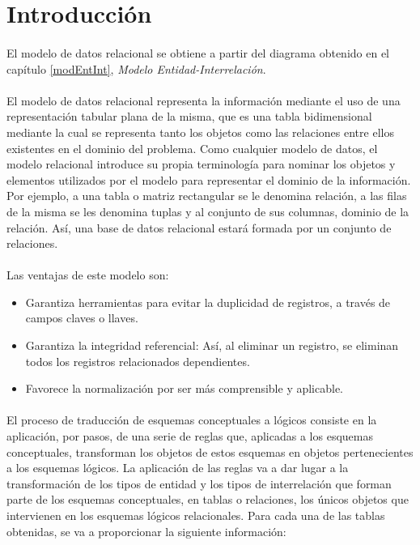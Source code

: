 \section{Introducción}

   \paragraph{}El modelo de datos relacional se obtiene a partir del diagrama
   obtenido en el capítulo \ref{modEntInt}, \textit{Modelo
   Entidad-Interrelación}.

   \paragraph{}El modelo de datos relacional representa la información mediante
   el uso de una representación tabular plana de la misma, que es una tabla
   bidimensional mediante la cual se representa tanto los objetos como las
   relaciones entre ellos existentes en el dominio del problema. Como cualquier
   modelo de datos, el modelo relacional introduce su propia terminología para
   nominar los objetos y elementos utilizados por el modelo para representar el
   dominio de la información. Por ejemplo, a una tabla o matriz rectangular se
   le denomina relación, a las filas de la misma se les denomina tuplas y al
   conjunto de sus columnas, dominio de la relación. Así, una base de datos
   relacional estará formada por un conjunto de relaciones.

   \paragraph{}Las ventajas de este modelo son:

   \begin{itemize}
    \item Garantiza herramientas para evitar la duplicidad de registros, a
    través de campos claves o llaves.
    \item Garantiza la integridad referencial: Así, al eliminar un registro,
    se eliminan todos los registros relacionados dependientes.
    \item Favorece la normalización por ser más comprensible y aplicable.
   \end{itemize}

   \paragraph{}El proceso de traducción de esquemas conceptuales a lógicos
   consiste en la aplicación, por pasos, de una serie de reglas que, aplicadas a
   los esquemas conceptuales, transforman los objetos de estos esquemas en
   objetos pertenecientes a los esquemas lógicos. La aplicación de las reglas va
   a dar lugar a la transformación de los tipos de entidad y los tipos de
   interrelación que forman parte de los esquemas conceptuales, en tablas o
   relaciones, los únicos objetos que intervienen en los esquemas lógicos
   relacionales. Para cada una de las tablas obtenidas, se va a proporcionar la
   siguiente información:

